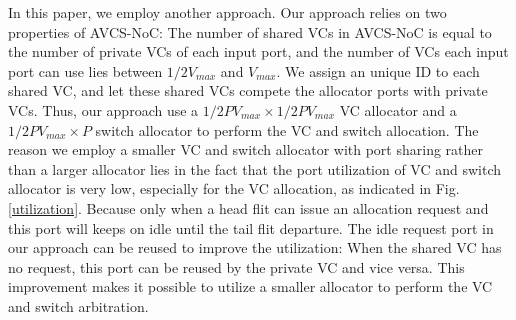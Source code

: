 \documentclass[10pt,conference]{IEEEtran}
\begin{document}
In this paper, we employ another approach. Our approach relies on two properties of AVCS-NoC: The number of shared VCs in AVCS-NoC is equal to the number of private VCs of each input port, and the number of VCs each input port can use lies between $1/2V_{max}$ and $V_{max}$. We assign an unique ID to each shared VC, and let these shared VCs compete the allocator ports with private VCs. Thus, our approach use a $1/2PV_{max}\times 1/2PV_{max}$ VC allocator and a $1/2PV_{max}\times P$ switch allocator to perform the VC and switch allocation. The reason we employ a smaller VC and switch allocator with port sharing rather than a larger allocator lies in the fact that the port utilization of VC and switch allocator is very low, especially for the VC allocation, as indicated in Fig. \ref{utilization}. Because only when a head flit can issue an allocation request and this port will keeps on idle until the tail flit departure. The idle request port in our approach can be reused to improve the utilization: When the shared VC has no request, this port can be reused by the private VC and vice versa. This improvement makes it possible to utilize a smaller allocator to perform the VC and switch arbitration.

\end{document}
